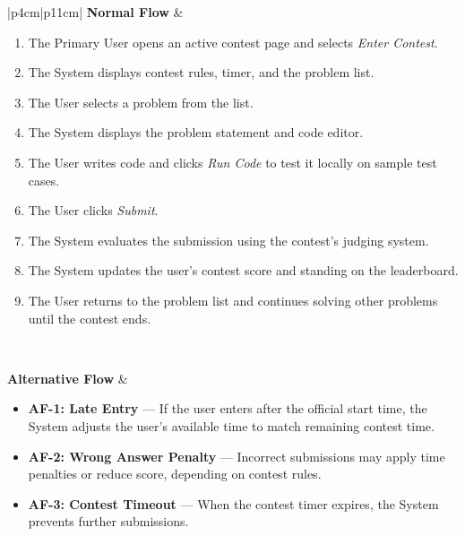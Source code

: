 \begin{longtable}{|p{4cm}|p{11cm}|}
\textbf{Normal Flow} &
\begin{minipage}[t]{\linewidth}
\begin{enumerate}[nosep, leftmargin=*]
\setlength\itemsep{0pt}
\setlength\topsep{0pt}
\setlength\partopsep{0pt}
\setlength\parsep{0pt}
    \item The Primary User opens an active contest page and selects \textit{Enter Contest}.
    \item The System displays contest rules, timer, and the problem list.
    \item The User selects a problem from the list.
    \item The System displays the problem statement and code editor.
    \item The User writes code and clicks \textit{Run Code} to test it locally on sample test cases.
    \item The User clicks \textit{Submit}.
    \item The System evaluates the submission using the contest's judging system.
    \item The System updates the user's contest score and standing on the leaderboard.
    \item The User returns to the problem list and continues solving other problems until the contest ends.
\end{enumerate}
\vspace{2pt}
\end{minipage}
\\ \hline

\textbf{Alternative Flow} &
\begin{minipage}[t]{\linewidth}
\begin{itemize}[nosep, leftmargin=*]
\setlength\itemsep{0pt}
\setlength\topsep{0pt}
\setlength\partopsep{0pt}
\setlength\parsep{0pt}
    \item \textbf{AF-1: Late Entry} — If the user enters after the official start time, the System adjusts the user’s available time to match remaining contest time.
    \item \textbf{AF-2: Wrong Answer Penalty} — Incorrect submissions may apply time penalties or reduce score, depending on contest rules.
    \item \textbf{AF-3: Contest Timeout} — When the contest timer expires, the System prevents further submissions.
\end{itemize}
\vspace{2pt}
\end{minipage}
\\ \hline


\end{longtable}
